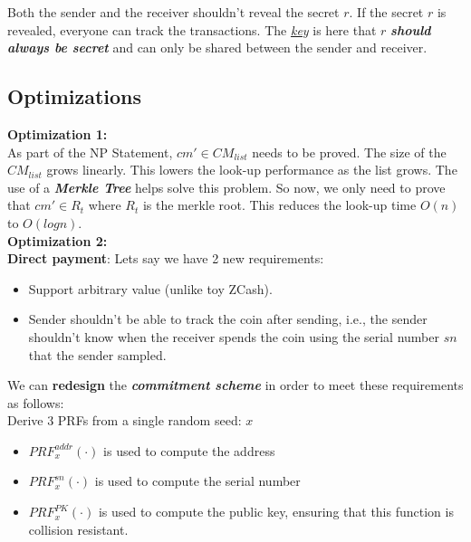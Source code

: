 \documentclass[twoside]{article}
\begin{document}
Both the sender and the receiver shouldn't reveal the secret $r$. If the secret $r$ is revealed, everyone can track the transactions. The \textit{\underline{key}} is here that $r$ \textit{\textbf{should always be secret}} and can only be shared between the sender and receiver. 
\subsection{Optimizations}
\textbf{Optimization 1:} \\
As part of the NP Statement, $cm' \in CM_{list}$ needs to be proved. The size of the $CM_{list}$ grows linearly. This lowers the look-up performance as the list grows. The use of a \textit{\textbf{Merkle Tree}} helps solve this problem. So now, we only need to prove that $cm' \in R_t$ where $R_t$ is the merkle root. This reduces the look-up time $O(n)$ to $O(log n)$.\\

\textbf{Optimization 2:} \\
\textbf{Direct payment}: Lets say we have 2 new requirements: 
\begin{itemize}
    \item Support arbitrary value (unlike toy ZCash).
    \item Sender shouldn't be able to track the coin after sending, i.e., the sender shouldn't know when the receiver spends the coin using the serial number $sn$ that the sender sampled.
\end{itemize}
We can \textbf{redesign} the \textbf{\textit{commitment scheme}} in order to meet these requirements as follows: \\
Derive 3 PRFs from a single random seed: $x$
\begin{itemize}
    \item $PRF_x^{addr}(\cdot)$ is used to compute the address
    \item $PRF_x^{sn}(\cdot)$ is used to compute the serial number
    \item $PRF_x^{PK}(\cdot)$ is used to compute the public key, ensuring that this function is collision resistant. 
\end{itemize}
\end{document}
